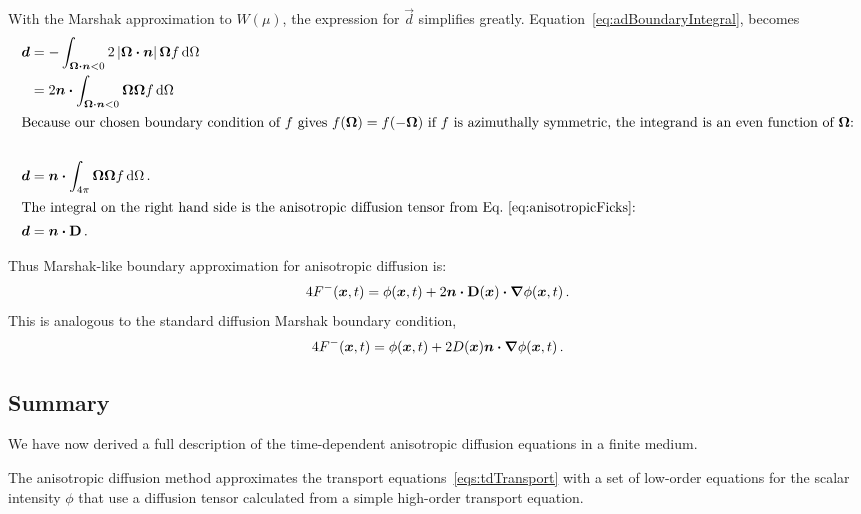 With the Marshak approximation to $W(\mu)$, the expression for $\vec{d}$
simplifies greatly.  Equation~\eqref{eq:adBoundaryIntegral}, becomes
\begin{align*}
  \bm{d} &=
  -\int_{\bm{\Omega}\bm{\cdot}\bm{n} < 0} 2 \left| \bm{\Omega}\bm{\cdot}\bm{n} \right|
  \bm{\Omega} f \mathop{}\!\mathrm{d}\Omega
  \\
  &= 
  2 \bm{n}\bm{\cdot} \int_{\bm{\Omega}\bm{\cdot}\bm{n} < 0} \bm{\Omega}
  \bm{\Omega} f \mathop{}\!\mathrm{d}\Omega
  \\
  \intertext{Because our chosen boundary condition of $f$ gives
  $f(\bm{\Omega})=f(-\bm{\Omega})$ if $f$ is azimuthally symmetric, the
  integrand is an even function of $\bm{\Omega}$:}
  \\
   \bm{d} &=
  \bm{n}\bm{\cdot}\int_{4\pi} \bm{\Omega} \bm{\Omega} f \mathop{}\!\mathrm{d}\Omega \,.
  \\ 
  \intertext{The integral on the right hand side is the anisotropic diffusion
  tensor from Eq.~\eqref{eq:anisotropicFicks}:}
  \bm{d} &= \bm{n}\bm{\cdot}\mathbf{D} \,.
\end{align*}

Thus Marshak-like boundary approximation for anisotropic diffusion is:
\begin{equation}\label{eq:marshakAd}
  4 F^-(\bm{x}, t)
  = \phi(\bm{x}, t)
  + 2 \bm{n} \bm{\cdot} \mathbf{D}(\bm{x}) \bm{\cdot} \bm{\nabla} \phi(\bm{x}, t) \,.
\end{equation}
This is analogous to the standard diffusion Marshak boundary condition,
\begin{equation*}
  4 F^-(\bm{x}, t) = \phi(\bm{x}, t)
  + 2 D(\bm{x}) \bm{n} \bm{\cdot} \bm{\nabla} \phi(\bm{x}, t)\,.
\end{equation*}

\subsection{Summary}
We have now derived a full description of the time-dependent anisotropic
diffusion equations in a finite medium. 

The anisotropic diffusion method approximates the transport
equations~\eqref{eqs:tdTransport} with a set of low-order equations for the
scalar intensity $\phi$ that use a diffusion tensor calculated from a
simple high-order transport equation.

